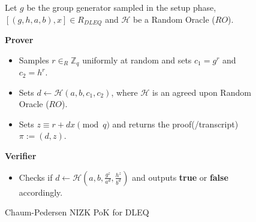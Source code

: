 \begin{figure}[t!]
    \centering
    \begin{tcolorbox}[title=\textbf{Chaum-Pedersen Protocol for DLEQ}, width=0.9\textwidth, colframe=blue!75!black, colback=blue!10, sharp corners]
        Let $g$ be the group generator sampled in the setup phase, $[(g,h,a,b),x]\in R_{DLEQ}$ and 
        $\mathcal{H}$ be a Random Oracle ($RO$).\par
        \vspace{0.5em}
        \textbf{Prover}
        \begin{itemize}
            \item Samples $r\in_{R}\mathbb{Z}_q$ uniformly at random and sets 
                $c_1=g^r$ and $c_2=h^r$.
            \item Sets $d\leftarrow \mathcal{H}(a,b,c_1,c_2)$, where $\mathcal{H}$ is 
                an agreed upon Random Oracle ($RO$).
            \item Sets $z\equiv r+dx \pmod{q}$ and returns the proof(/transcript) $\pi:= (d,z)$.
        \end{itemize}
        
        \vspace{0.5em}
        \textbf{Verifier}
        \begin{itemize}
            \item Checks if $d\leftarrow \mathcal{H}(a,b,\frac{g^z}{a^d},\frac{h^z}{b^d})$ 
                and outputs \textbf{true} or \textbf{false} accordingly.
        \end{itemize}
    \end{tcolorbox}
    \caption{Chaum-Pedersen NIZK PoK for DLEQ}
    \label{fig:chaum-pedersen}
\end{figure}
